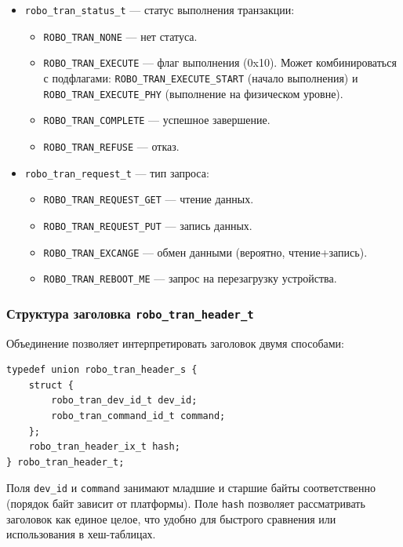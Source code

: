 \documentclass[a4paper,12pt]{article}
\begin{document}
\begin{itemize}
    \item \texttt{robo\_tran\_status\_t} — статус выполнения транзакции:
        \begin{itemize}
            \item \texttt{ROBO\_TRAN\_NONE} — нет статуса.
            \item \texttt{ROBO\_TRAN\_EXECUTE} — флаг выполнения (0x10). Может комбинироваться с подфлагами: \texttt{ROBO\_TRAN\_EXECUTE\_START} (начало выполнения) и \texttt{ROBO\_TRAN\_EXECUTE\_PHY} (выполнение на физическом уровне).
            \item \texttt{ROBO\_TRAN\_COMPLETE} — успешное завершение.
            \item \texttt{ROBO\_TRAN\_REFUSE} — отказ.
        \end{itemize}
    \item \texttt{robo\_tran\_request\_t} — тип запроса:
        \begin{itemize}
            \item \texttt{ROBO\_TRAN\_REQUEST\_GET} — чтение данных.
            \item \texttt{ROBO\_TRAN\_REQUEST\_PUT} — запись данных.
            \item \texttt{ROBO\_TRAN\_EXCANGE} — обмен данными (вероятно, чтение+запись).
            \item \texttt{ROBO\_TRAN\_REBOOT\_ME} — запрос на перезагрузку устройства.
        \end{itemize}
\end{itemize}

\subsubsection{Структура заголовка \texttt{robo\_tran\_header\_t}}

Объединение позволяет интерпретировать заголовок двумя способами:

\begin{lstlisting}[caption={Header union}]
typedef union robo_tran_header_s {
    struct {
        robo_tran_dev_id_t dev_id;
        robo_tran_command_id_t command;
    };
    robo_tran_header_ix_t hash;
} robo_tran_header_t;
\end{lstlisting}

Поля \texttt{dev\_id} и \texttt{command} занимают младшие и старшие байты соответственно (порядок байт зависит от платформы). Поле \texttt{hash} позволяет рассматривать заголовок как единое целое, что удобно для быстрого сравнения или использования в хеш-таблицах.
\end{document}
